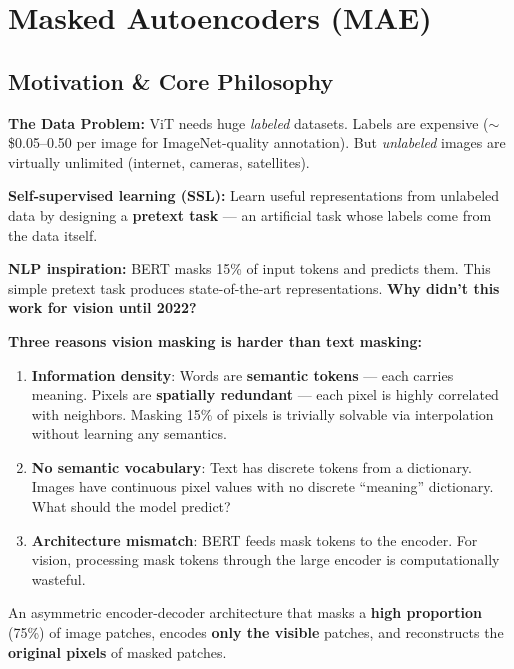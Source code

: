 \section{Masked Autoencoders (MAE)}

\subsection{Motivation \& Core Philosophy}
\textbf{The Data Problem:} ViT needs huge \emph{labeled} datasets. Labels are expensive ($\sim$\$0.05--0.50 per image for ImageNet-quality annotation). But \emph{unlabeled} images are virtually unlimited (internet, cameras, satellites).

\textbf{Self-supervised learning (SSL):} Learn useful representations from unlabeled data by designing a \textbf{pretext task} — an artificial task whose labels come from the data itself.

\textbf{NLP inspiration:} BERT masks 15\% of input tokens and predicts them. This simple pretext task produces state-of-the-art representations. \textbf{Why didn't this work for vision until 2022?}

\textbf{Three reasons vision masking is harder than text masking:}
\begin{enumerate}
\item \textbf{Information density}: Words are \textbf{semantic tokens} — each carries meaning. Pixels are \textbf{spatially redundant} — each pixel is highly correlated with neighbors. Masking 15\% of pixels is trivially solvable via interpolation without learning any semantics.
\item \textbf{No semantic vocabulary}: Text has discrete tokens from a dictionary. Images have continuous pixel values with no discrete ``meaning'' dictionary. What should the model predict?
\item \textbf{Architecture mismatch}: BERT feeds mask tokens to the encoder. For vision, processing mask tokens through the large encoder is computationally wasteful.
\end{enumerate}

\begin{definition}[MAE]
An asymmetric encoder-decoder architecture that masks a \textbf{high proportion} (75\%) of image patches, encodes \textbf{only the visible} patches, and reconstructs the \textbf{original pixels} of masked patches.
\end{definition}

